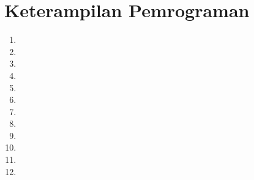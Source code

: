 \chapter*{Keterampilan Pemrograman}
\begin{enumerate}
\item 

\item 

\item 

\item 

\item 

\item 

\item 

\item 

\item 

\item 

\item 

\item 

\end{enumerate}

